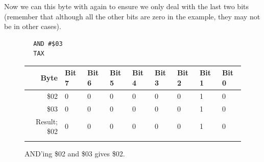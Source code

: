 \begin{figure}[H]
  {
    \setlength{\tabcolsep}{3.0pt}
    \setlength\cmidrulewidth{\lightrulewidth} %
    \begin{adjustbox}{width=4cm,center}
    \end{adjustbox}
  }
\end{figure}

Now we can  this byte with  again to ensure we only deal with the last two bits
(remember that although all the other bits are zero in the example, they may not be in other cases).

\begin{lstlisting}
        AND #$03
        TAX
\end{lstlisting}

\begin{figure}[H]
  {
    \setlength{\tabcolsep}{3.0pt}
    \setlength\cmidrulewidth{\heavyrulewidth} %
    \begin{adjustbox}{width=10cm,center}

      \begin{tabular}{rllllllll}
        \toprule
        Byte & Bit 7 & Bit 6 & Bit 5 & Bit 4 & Bit 3 & Bit 2 & Bit 1 & Bit 0        \\
        \midrule
        \$02 & 0 & 0 & 0 & 0 & 0 & 0 & 1 & 0 \\
        \$03 & 0 & 0 & 0 & 0 & 0 & 0 & 1 & 0 \\
        \midrule
        Result; \$02 & 0 & 0 & 0 & 0 & 0 & 0 & 1 & 0 \\
        \addlinespace
        \bottomrule
      \end{tabular}

    \end{adjustbox}

  }\caption*{AND'ing \$02 and \$03 gives \$02.}
\end{figure}

